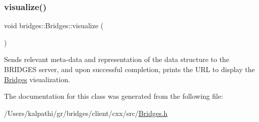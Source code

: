 \subsubsection{\texorpdfstring{visualize()}{visualize()}}
{\footnotesize\ttfamily void bridges\+::\+Bridges\+::visualize (\begin{DoxyParamCaption}{ }\end{DoxyParamCaption})\hspace{0.3cm}{\ttfamily [inline]}}

Sends relevant meta-\/data and representation of the data structure to the B\+R\+I\+D\+G\+ES server, and upon successful completion, prints the U\+RL to display the \mbox{\hyperlink{classbridges_1_1_bridges}{Bridges}} visualization. 

The documentation for this class was generated from the following file\+:\begin{DoxyCompactItemize}
\item 
/\+Users/kalpathi/gr/bridges/client/cxx/src/\mbox{\hyperlink{_bridges_8h}{Bridges.\+h}}\end{DoxyCompactItemize}
